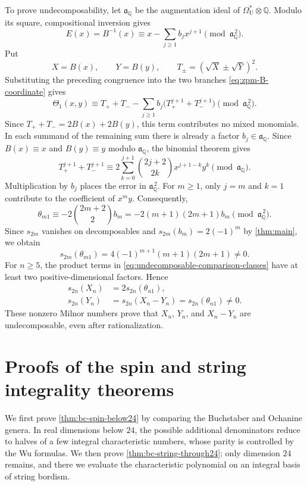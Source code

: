 \documentclass[14pt,dvipsnames]{extarticle}
\makeatletter
\numberwithin{equation}{subsection}
\theoremstyle{plain}
\theoremstyle{definition}
\theoremstyle{definition}
\renewenvironment{proof}[1][\proofname]{
 \par\pushQED{\qed}\normalfont
 \topsep6\p@\@plus6\p@\relax
 \trivlist\item[\hskip\labelsep\bfseries\itshape #1\@addpunct{.}]
}{\popQED\endtrivlist\@endpefalse}
\newcommand{\OmU}{\Omega_{\mathrm U}^{\ast}}
\newcommand{\Q}{\mathbb{Q}}
\makeatother
\begin{document}
\begin{proof}[Proof of \cref{thm:bc-not-determined}]
To prove undecomposability, let $\mathfrak a_{\Q}$ be the augmentation ideal
of $\OmU\otimes\Q$. Modulo its square, compositional inversion gives
\[
 E(x)=B^{-1}(x)
 \equiv x-\sum_{j\geq1}b_jx^{j+1}\pmod{\mathfrak a_{\Q}^{\,2}}.
\]
Put
\[
 X=B(x),\qquad Y=B(y),\qquad
 T_\pm=(\sqrt X\pm\sqrt Y)^2.
\]
Substituting the preceding congruence into the two branches
\eqref{eq:zpm-B-coordinate} gives
\[
 \Theta_1(x,y)
 \equiv T_++T_-
 -\sum_{j\geq1}b_j\bigl(T_+^{j+1}+T_-^{j+1}\bigr)
 \pmod{\mathfrak a_{\Q}^{\,2}}.
\]
Since $T_++T_-=2B(x)+2B(y)$, this term contributes no mixed monomials.
In each summand of the remaining sum there is already a factor
$b_j\in\mathfrak a_{\Q}$. Since $B(x)\equiv x$ and $B(y)\equiv y$ modulo
$\mathfrak a_{\Q}$, the binomial theorem gives
\[
 T_+^{j+1}+T_-^{j+1}
 \equiv
 2\sum_{k=0}^{j+1}\binom{2j+2}{2k}x^{j+1-k}y^k
 \pmod{\mathfrak a_{\Q}}.
\]
Multiplication by $b_j$ places the error in
$\mathfrak a_{\Q}^{\,2}$. For $m\geq1$, only $j=m$ and $k=1$ contribute
to the coefficient of $x^my$. Consequently,
\[
 \theta_{m1}
 \equiv-2\binom{2m+2}{2}b_m
 =-2(m+1)(2m+1)b_m
 \pmod{\mathfrak a_{\Q}^{\,2}}.
\]
Since $s_{2m}$ vanishes on decomposables and
$s_{2m}(b_m)=2(-1)^m$ by \cref{thm:main}, we obtain
\begin{equation}\label{eq:milnor-theta-m1}
 s_{2m}(\theta_{m1})=4(-1)^{m+1}(m+1)(2m+1)\ne0.
\end{equation}
For $n\geq5$, the product terms in
\eqref{eq:undecomposable-comparison-classes} have at least two
positive-dimensional factors. Hence
\[
 \begin{aligned}
  s_{2n}(X_n)&=2s_{2n}(\theta_{n1}),\\
  s_{2n}(Y_n)&=s_{2n}(X_n-Y_n)=s_{2n}(\theta_{n1})\ne0.
 \end{aligned}
\]
These nonzero Milnor numbers prove that $X_n$, $Y_n$, and $X_n-Y_n$ are
undecomposable, even after rationalization.
\end{proof}


\section{Proofs of the spin and string integrality theorems}
\label{sec:spin-integrality}

We first prove \cref{thm:bc-spin-below24} by comparing the Buchstaber and
Ochanine genera. In real dimensions below $24$, the possible additional
denominators reduce to halves of a few integral characteristic numbers, whose
parity is controlled by the Wu formulas. We then prove
\cref{thm:bc-string-through24}; only dimension $24$ remains, and there we
evaluate the characteristic polynomial on an integral basis of string
bordism.
\end{document}
